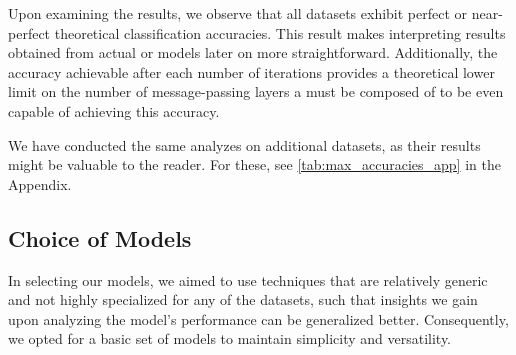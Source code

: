 \begin{table}[!htb]
	\caption{An overview of the maximum theoretical classification accuracy achievable for each dataset based on the number of \wl iterations in percent. A hyphen ``-'' indicates that the maximum accuracy has converged with fewer iterations, implying that further iterations do not improve the accuracy.}
	\label{tab:max_accuracies}
\end{table}

Upon examining the results, we observe that all datasets exhibit perfect or near-perfect theoretical classification accuracies. This result makes interpreting results obtained from actual \wlnn or \gnn models later on more straightforward. Additionally, the accuracy achievable after each number of iterations provides a theoretical lower limit on the number of message-passing layers a \gnn must be composed of to be even capable of achieving this accuracy. 

We have conducted the same analyzes on additional datasets, as their results might be valuable to the reader. For these, see \cref{tab:max_accuracies_app} in the Appendix.


\subsection{Choice of Models}
In selecting our models, we aimed to use techniques that are relatively generic and not highly specialized for any of the datasets, such that insights we gain upon analyzing the model's performance can be generalized better. Consequently, we opted for a basic set of models to maintain simplicity and versatility.

